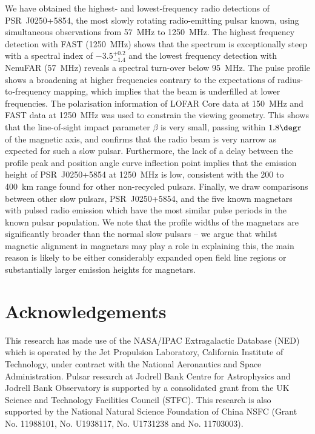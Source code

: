We have obtained the highest- and lowest-frequency radio detections of PSR~J0250+5854, the most slowly rotating radio-emitting pulsar known, using simultaneous observations from 57~MHz to 1250~MHz. The highest frequency detection with FAST (1250~MHz) shows that the spectrum is exceptionally steep with a spectral index of $-3.5^{+0.2}_{-1.4}$ and the lowest frequency detection with NenuFAR (57~MHz) reveals a spectral turn-over below 95~MHz. The pulse profile shows a broadening at higher frequencies contrary to the expectations of radius-to-frequency mapping, which implies that the beam is underfilled at lower frequencies. The polarisation information of LOFAR Core data at 150~MHz and FAST data at 1250~MHz was used to constrain the viewing geometry. This shows that the line-of-sight impact parameter $\beta$ is very small, passing within $1.8\degr$ of the magnetic axis, and confirms that the radio beam is very narrow as expected for such a slow pulsar. Furthermore, the lack of a delay between the profile peak and position angle curve inflection point implies that the emission height of PSR~J0250+5854 at 1250~MHz is low, consistent with the 200 to 400~km range found for other non-recycled pulsars. Finally, we draw comparisons between other slow pulsars, PSR~J0250+5854, and the five known magnetars with pulsed radio emission which have the most similar pulse periods in the known pulsar population. We note that the profile widths of the magnetars are significantly broader than the normal slow pulsars -- we argue that whilst magnetic alignment in magnetars may play a role in explaining this, the main reason is likely to be either considerably expanded open field line regions or substantially larger emission heights for magnetars.

\section*{Acknowledgements}

This research has made use of the NASA/IPAC Extragalactic Database (NED) which is operated by the Jet Propulsion Laboratory, California Institute of Technology, under contract with the National Aeronautics and Space Administration.  Pulsar research at Jodrell Bank Centre for Astrophysics and Jodrell Bank Observatory is supported by a consolidated grant from the UK Science and Technology Facilities Council (STFC). This research is also supported by the National Natural Science Foundation of China NSFC (Grant No. 11988101, No. U1938117, No. U1731238 and No. 11703003).

